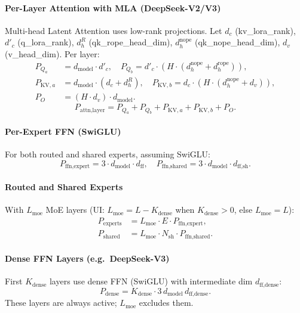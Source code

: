\documentclass[11pt]{article}
\begin{document}
\paragraph{Per-Layer Attention with MLA (DeepSeek-V2/V3)}
Multi-head Latent Attention uses low-rank projections. Let $d_c$ (kv\_lora\_rank),
$d'_c$ (q\_lora\_rank), $d^R_h$ (qk\_rope\_head\_dim), $d^{\text{nope}}_h$ (qk\_nope\_head\_dim),
$d_v$ (v\_head\_dim). Per layer:
\begin{align*}
P_{Q_a} &= d_{\text{model}} \cdot d'_c, \quad
P_{Q_b} = d'_c \cdot (H \cdot (d^{\text{nope}}_h + d^{\text{rope}}_h)), \\
P_{\text{KV},a} &= d_{\text{model}} \cdot (d_c + d^R_h), \quad
P_{\text{KV},b} = d_c \cdot (H \cdot (d^{\text{nope}}_h + d_v)), \\
P_O &= (H \cdot d_v) \cdot d_{\text{model}}.
\end{align*}
\[
P_{\text{attn,layer}} = P_{Q_a} + P_{Q_b} + P_{\text{KV},a} + P_{\text{KV},b} + P_O.
\]

\paragraph{Per-Expert FFN (SwiGLU)}
For both routed and shared experts, assuming SwiGLU:
\[
P_{\text{ffn,expert}} = 3 \cdot d_{\text{model}} \cdot d_{\text{ff}},
\quad
P_{\text{ffn,shared}} = 3 \cdot d_{\text{model}} \cdot d_{\text{ff,sh}}.
\]

\paragraph{Routed and Shared Experts}
With $L_{\text{moe}}$ MoE layers (UI: $L_{\text{moe}} = L - K_{\text{dense}}$ when $K_{\text{dense}} > 0$, else $L_{\text{moe}} = L$):
\begin{align*}
P_{\text{experts}} &= L_{\text{moe}} \cdot E \cdot P_{\text{ffn,expert}}, \\
P_{\text{shared}}  &= L_{\text{moe}} \cdot N_{\text{sh}} \cdot P_{\text{ffn,shared}}.
\end{align*}

\paragraph{Dense FFN Layers (e.g.\ DeepSeek-V3)}
First $K_{\text{dense}}$ layers use dense FFN (SwiGLU) with intermediate dim $d_{\text{ff,dense}}$:
\[
P_{\text{dense}} = K_{\text{dense}} \cdot 3 \, d_{\text{model}} \, d_{\text{ff,dense}}.
\]
These layers are always active; $L_{\text{moe}}$ excludes them.
\end{document}
